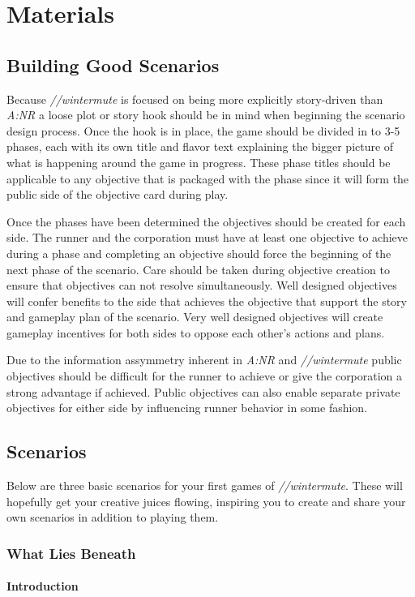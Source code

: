 \documentclass[titlepage]{article}
\begin{document}
\section{Materials}
	\subsection{Building Good Scenarios}
		Because \emph{//wintermute} is focused on being more explicitly story-driven than \emph{A:NR} a loose plot or story hook should be in mind when beginning the scenario design process. Once the hook is in place, the game should be divided in to 3-5 phases, each with its own title and flavor text explaining the bigger picture of what is happening around the game in progress. These phase titles should be applicable to any objective that is packaged with the phase since it will form the public side of the objective card during play.

		Once the phases have been determined the objectives should be created for each side. The runner and the corporation must have at least one objective to achieve during a phase and completing an objective should force the beginning of the next phase of the scenario. Care should be taken during objective creation to ensure that objectives can not resolve simultaneously. Well designed objectives will confer benefits to the side that achieves the objective that support the story and gameplay plan of the scenario. Very well designed objectives will create gameplay incentives for both sides to oppose each other's actions and plans.

		Due to the information assymmetry inherent in \emph{A:NR} and \emph{//wintermute} public objectives should be difficult for the runner to achieve or give the corporation a strong advantage if achieved. Public objectives can also enable separate private objectives for either side by influencing runner behavior in some fashion.
	\subsection{Scenarios}
		Below are three basic scenarios for your first games of \emph{//wintermute}. These will hopefully get your creative juices flowing, inspiring you to create and share your own scenarios in addition to playing them.
		\subsubsection{What Lies Beneath}
			\paragraph{Introduction}
\end{document}
